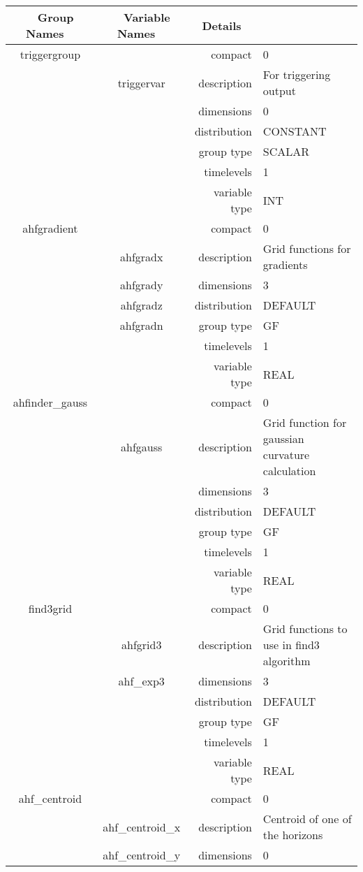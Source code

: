 \begin{tabular*}{150mm}{|c|c@{\extracolsep{\fill}}|rl|} \hline 
~ {\bf Group Names} ~ & ~ {\bf Variable Names} ~  &{\bf Details} ~ & ~\\ 
\hline 
triggergroup &  & compact & 0 \\ 
 & triggervar & description & For triggering output \\ 
 &  & dimensions & 0 \\ 
 &  & distribution & CONSTANT \\ 
 &  & group type & SCALAR \\ 
 &  & timelevels & 1 \\ 
 &  & variable type & INT \\ 
\hline 
ahfgradient &  & compact & 0 \\ 
 & ahfgradx & description & Grid functions for gradients \\ 
 & ahfgrady & dimensions & 3 \\ 
 & ahfgradz & distribution & DEFAULT \\ 
 & ahfgradn & group type & GF \\ 
 &  & timelevels & 1 \\ 
 &  & variable type & REAL \\ 
\hline 
ahfinder\_gauss &  & compact & 0 \\ 
 & ahfgauss & description & Grid function for gaussian curvature calculation \\ 
 &  & dimensions & 3 \\ 
 &  & distribution & DEFAULT \\ 
 &  & group type & GF \\ 
 &  & timelevels & 1 \\ 
 &  & variable type & REAL \\ 
\hline 
find3grid &  & compact & 0 \\ 
 & ahfgrid3 & description & Grid functions to use in find3 algorithm \\ 
 & ahf\_exp3 & dimensions & 3 \\ 
 &  & distribution & DEFAULT \\ 
 &  & group type & GF \\ 
 &  & timelevels & 1 \\ 
 &  & variable type & REAL \\ 
\hline 
ahf\_centroid &  & compact & 0 \\ 
 & ahf\_centroid\_x & description & Centroid of one of the horizons \\ 
 & ahf\_centroid\_y & dimensions & 0 \\ 

\end{tabular*}
